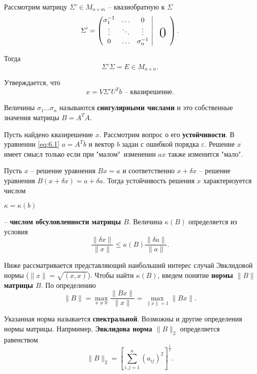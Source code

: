 Рассмотрим матрицу $\Sigma' \in M_{n \times m}$ -- квазиобратную к $\Sigma$
\begin{equation} 
	\Sigma' = \begin{pmatrix}
		\begin{matrix}
		\sigma_1^{-1} & \dots & 0  \\
		\vdots & \ddots & \vdots \\
		0 & \dots & \sigma_n^{-1}
		\end{matrix} 
		& \rvline & & \bigzero &
	\end{pmatrix}.
\end{equation}

Тогда 
\begin{equation}
	\Sigma'\Sigma = E \in M_{n \times n}.
\end{equation}

Утверждается, что 
\begin{equation}
	x = V \Sigma'U^Tb \textrm{ -- квазирешение}.
\end{equation}

Величины $\sigma_1 \dots \sigma_n$ называются \textbf{сингулярными числами} и это собственные значения матрицы $B = A^TA$.

Пусть найдено квазирешение $x$. Рассмотрим вопрос о его \textbf{устойчивости}. В уравнении \ref{eq:6.1} $a = A^Tb$ и вектор $b$ задан с ошибкой порядка $\varepsilon$. Решение $x$ имеет смысл только если при "малом"\ изменении $a x$ также изменится "мало".

Пусть $x$ -- решение уравнения $Bx = a$ и соответственно $x + \delta x$ -- решение уравнения $B(x+\delta x) = a+\delta a$. Тогда устойчивость решения $x$ характеризуется числом \parbox{16mm}{$\kappa = \kappa(b)$} -- \textbf{числом обсуловленности матрицы $B$}. Величина $\kappa(B)$ определяется из условия 
\begin{equation} \label{eq:6.30}
	\frac{\|\delta x\|}{\|x\|} \leq \kappa(B) \frac{\|\delta a\|}{\|a\|}.
\end{equation}

Ниже рассматривается представляющий наибольший интерес случай Эвклидовой нормы ($\|x\| = \sqrt{(x, x)}$). Чтобы найти $\kappa(B)$, введем понятие \textbf{нормы $\|B\|$ матрицы $B$}. По определению
\begin{equation} \label{eq:6.31}
	\|B\| = \max_{x \neq 0} \frac{\|Bx\|}{\|x\|} = \max_{\|x\| = 1} \|Bx\|.
\end{equation}

Указанная норма называется \textbf{спектральной}. Возможны и другие определения нормы матрицы. Напрмимер, \textbf{Эвклидова норма $\|B\|_2$} определяется равенством
\begin{equation}
	\|B\|_2 = [\sum^n_{i, j=1}{(a_{ij})^2}]^{\frac{1}{2}}.
\end{equation}

